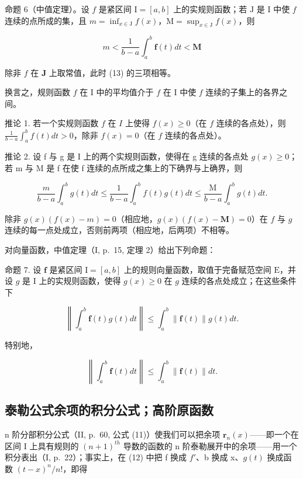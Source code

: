 命题 6（中值定理）。设 \(f\) 是紧区间 \(\mathrm{I} = [a, b]\) 上的实规则函数；若 \(\mathrm{J}\) 是 \(\mathrm{I}\) 中使 \(f\) 连续的点所成的集，且 \(m = \inf_{x \in \mathrm{J}} f(x)\)，\(\mathrm{M} = \sup_{x \in \mathrm{J}} f(x)\)，则

\[
m <   \frac {1}{b - a} \int_ {a} ^ {b} \mathbf {f} (t) d t <   \mathbf {M}\tag{13}
\]

除非 \(f\) 在 \(\mathbf{J}\) 上取常值，此时 (13) 的三项相等。

换言之，规则函数 \(f\) 在 I 中的平均值介于 \(f\) 在 I 中使 \(f\) 连续的子集上的各界之间。

推论 1. 若一个实规则函数 \(f\) 在 \(I\) 上使得 \(f(x) \geqslant 0\)（在 \(f\) 连续的各点处），则 \(\frac{1}{b - a} \int_{a}^{b} f(t) dt > 0\)，除非 \(f(x) = 0\)（在 \(f\) 连续的各点处）。

推论 2. 设 f 与 g 是 I 上的两个实规则函数，使得在 g 连续的各点处 \(g(x) \geqslant 0\)；若 m 与 M 是 f 在使 f 连续的点所成之集上的下确界与上确界，则

\[
\frac {m}{b - a} \int_ {a} ^ {b} g (t) d t \leqslant \frac {1}{b - a} \int_ {a} ^ {b} f (t) g (t) d t \leqslant \frac {\mathrm{M}}{b - a} \int_ {a} ^ {b} g (t) d t.\tag{14}
\]

除非 \(g(x)(f(x) - m) = 0\)（相应地，\(g(x)(f(x) - \mathbf{M}) = 0\)）在 \(f\) 与 \(g\) 连续的每一点处成立，否则前两项（相应地，后两项）不相等。

对向量函数，中值定理（I, p.~15, 定理 2）给出下列命题：

命题 7. 设 \(\mathbf{f}\) 是紧区间 \(\mathrm{I} = [a, b]\) 上的规则向量函数，取值于完备赋范空间 \(\mathrm{E}\)，并设 \(g\) 是 \(\mathrm{I}\) 上的实规则函数，使得 \(g(x) \geqslant 0\) 在 \(g\) 连续的各点处成立；在这些条件下

\[
\left\| \int_ {a} ^ {b} \mathbf {f} (t) g (t) d t \right\| \leqslant \int_ {a} ^ {b} \| \mathbf {f} (t) \| g (t) d t.\tag{15}
\]

特别地，

\[
\left\| \int_ {a} ^ {b} \mathbf {f} (t) d t \right\| \leqslant \int_ {a} ^ {b} \| \mathbf {f} (t) \| d t.\tag{16}
\]

\subsection{泰勒公式余项的积分公式；高阶原函数}

n 阶分部积分公式（II, p.~60, 公式 (11)）使我们可以把余项 \(\mathbf{r}_{n}(x)\)——即一个在区间 I 上具有规则的 \((n+1)^{th}\) 导数的函数的 n 阶泰勒展开中的余项——用一个积分表出（I, p.~22）；事实上，在 (12) 中把 f 换成 \(f'\)、b 换成 x、\(g(t)\) 换成函数 \((t-x)^{n}/n!\)，即得

